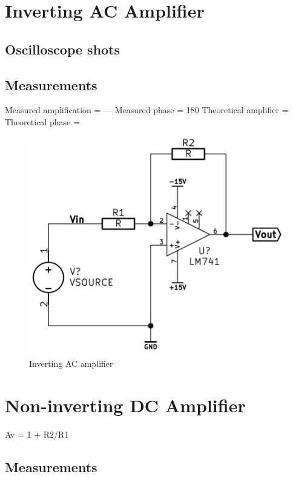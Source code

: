 \documentclass[]{article}
\begin{document}
\section{Inverting AC Amplifier}\label{inverting-ac-amplifier}

\subsection{Oscilloscope shots}\label{oscilloscope-shots}

\subsection{Measurements}\label{measurements-1}

Measured amplification = --- Measured phase = 180 Theoretical amplifier
=\\Theoretical phase =

\begin{figure}[htbp]
\centering
\includegraphics{img/invACamp.png}
\caption{Inverting AC amplifier}
\end{figure}

\section{Non-inverting DC Amplifier}\label{non-inverting-dc-amplifier}

Av = 1 + R2/R1

\subsection{Measurements}\label{measurements-2}
\end{document}

